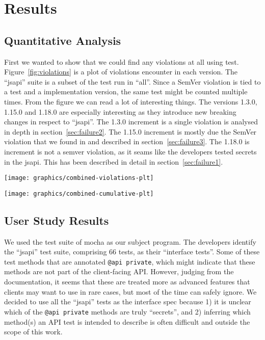 \section{Results}

\subsection{Quantitative Analysis}

First we wanted to show that we could find any violations at all using
test. Figure~\ref{fig:violations} is a plot of violations encounter in
each version. The ``jsapi'' suite is a subset of the test run in ``all''.
Since a SemVer violation is tied to a test and a implementation version, 
the same test might be counted multiple times. From the figure we can
read a lot of interesting things. The versions 1.3.0, 1.15.0 and 1.18.0 are
especially interesting as they introduce new breaking changes in respect to
``jsapi''.  The 1.3.0 increment is a single violation is analysed in depth in
section~\ref{sec:failure2}. The 1.15.0 increment is mostly due the SemVer
violation that we found in and described in section~\ref{sec:failure3}. The 
1.18.0 is increment is not a semver violation, as it seams like the developers
tested secrets in the jsapi. This has been described in detail in
section~\ref{sec:failure1}. 




\begin{figure*}
\centering
\texttt{[image: graphics/combined-violations-plt]}
\caption{Violations per version. ``jsapi'' is a subset of violations found in ``all''}
\label{fig:violations}
\end{figure*}

\begin{figure*}
\centering
\texttt{[image: graphics/combined-cumulative-plt]}
\caption{Violations per version}
\end{figure*}

\subsection{User Study Results}
We used the test suite of mocha as our subject program. The developers
identify the ``jsapi'' test suite, comprising 66 tests, as their
``interface tests''. Some of these test methods that are annotated
{\tt @api private}, which might indicate that these methods are not
part of the client-facing API\@. However, judging from the
documentation, it seems that these are treated more as advanced
features that clients may want to use in rare cases, but most of the
time can safely ignore. We decided to use all the ``jsapi'' tests as the
interface spec because 1) it is unclear which of the {\tt @api
  private} methods are truly ``secrets'', and 2) inferring which
method(s) an API test is intended to describe is often difficult and
outside the scope of this work.

